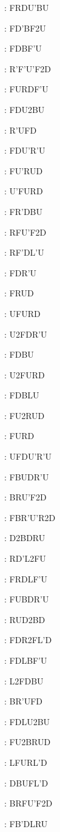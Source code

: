 \documentclass[9pt]{article}
\begin{document}
{\begin{multicols}{6}
: FRDU'BU

: FD'BF2U

: FDBF'U

: R'F'U'F2D

: FURDF'U

: FDU2BU

: R'UFD

: FDU'R'U

: FU'RUD

: U'FURD

: FR'DBU

: RFU'F2D

: RF'DL'U

: FDR'U

: FRUD

: UFURD

: U2FDR'U

: FDBU

: U2FURD

: FDBLU

: FU2RUD

: FURD

: UFDU'R'U

: FBUDR'U

: BRU'F2D

: FBR'U'R2D

: D2BDRU

: RD'L2FU

: FRDLF'U

: FUBDR'U

: RUD2BD

: FDR2FL'D

: FDLBF'U

: L2FDBU

: BR'UFD

: FDLU2BU

: FU2BRUD

: LFURL'D

: DBUFL'D

: BRFU'F2D

: FB'DLRU


\end{multicols}}
\end{document}
